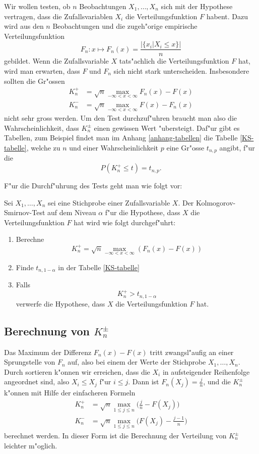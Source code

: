 Wir wollen testen, ob $n$ Beobachtungen $X_1,\dots,X_n$ sich mit
der Hypothese vertragen, dass die Zufallsvariablen $X_i$ die
Verteilungsfunktion $F$ habent.
Dazu wird aus den $n$ Beobachtungen
und die zugeh"orige empirische Verteilungsfunktion
\[
F_n\colon x\mapsto F_n(x)=\frac{|\{x_i|X_i\le x\}|}{n}
\]
gebildet.
Wenn die Zufallsvariable $X$ tats"achlich die
Verteilungsfunktion $F$ hat, wird man erwarten,
dass $F$ und $F_n$ sich nicht stark unterscheiden.
Insbesondere sollten die Gr"ossen
\begin{align}
K_n^+
&=
\sqrt{n}\max_{-\infty<x<\infty} F_n(x)-F(x)
\\
K_n^-
&=
\sqrt{n}\max_{-\infty<x<\infty} F(x)-F_n(x)
\end{align}
nicht sehr gross werden.
Um den Test durchzuf"uhren braucht man also
die Wahrscheinlichkeit, dass $K_n^{\pm}$ einen gewissen Wert "ubersteigt.
Daf"ur gibt es Tabellen, zum Beispiel findet man im Anhang \ref{anhang-tabellen}
die Tabelle \ref{KS-tabelle}, welche zu $n$ und einer Wahrscheinlichkeit
$p$ eine Gr"osse $t_{n,p}$ angibt, f"ur die
\[
P(K_n^+\le t)=t_{n,p}.
\]

F"ur die Durchf"uhrung des Tests geht man wie folgt vor:
\begin{satz} Sei $X_1,\dots,X_n$ sei eine Stichprobe einer Zufallsvariable $X$.
Der Kolmogorov-Smirnov-Test auf dem Niveau $\alpha$ f"ur die Hypothese,
dass $X$ die Verteilungsfunktion $F$ hat wird wie folgt durchgef"uhrt:
\begin{enumerate}
\item Berechne
\[
K_n^+ = \sqrt{n}\max_{-\infty<x<\infty} (F_n(x)-F(x))
\]
\item Finde $t_{n,1-\alpha}$ in der Tabelle \ref{KS-tabelle}
\item Falls
\[
K_n^+>t_{n,1-\alpha}
\]
verwerfe die Hypothese, dass $X$ die Verteilungsfunktion $F$ hat.
\end{enumerate}
\end{satz}

\subsection{Berechnung von \texorpdfstring{$K_n^{\pm}$}{Kn-plus-minus}}
Das Maximum der Differenz $F_n(x)-F(x)$ tritt zwangsl"aufig an einer
Sprungstelle von $F_n$ auf, also bei einem der Werte der Stichprobe
$X_1,\dots,X_n$.
Durch sortieren k"onnen wir erreichen, dass die
$X_i$  in aufsteigender Reihenfolge angeordnet sind, also $X_i\le X_j$
f"ur $i\le j$.
Dann ist $F_n(X_j)=\frac{j}{n}$, und
die  $K_n^{\pm}$ k"onnen mit Hilfe der einfacheren Formeln
\begin{align}
K_n^+
&=
\sqrt{n}\max_{1\le j\le n}\biggl(\frac{j}{n}-F(X_j)\biggr)
\label{knp-berechnungs-formel}
\\
K_n^-
&=
\sqrt{n}\max_{1\le j\le n}\biggl(F(X_j)-\frac{j-1}n\biggr)
\end{align}
berechnet werden.
In dieser Form ist die Berechnung der
Verteilung von $K_n^{\pm}$ leichter m"oglich.

